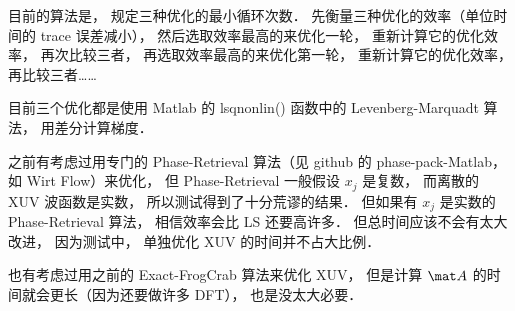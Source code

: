 目前的算法是， 规定三种优化的最小循环次数． 先衡量三种优化的效率（单位时间的 trace 误差减小）， 然后选取效率最高的来优化一轮， 重新计算它的优化效率， 再次比较三者， 再选取效率最高的来优化第一轮， 重新计算它的优化效率， 再比较三者……

目前三个优化都是使用 Matlab 的 lsqnonlin() 函数中的 Levenberg-Marquadt 算法， 用差分计算梯度．

之前有考虑过用专门的 Phase-Retrieval 算法（见 github 的 phase-pack-Matlab， 如 Wirt Flow）来优化， 但 Phase-Retrieval 一般假设 $x_j$ 是复数， 而离散的 XUV 波函数是实数， 所以测试得到了十分荒谬的结果． 但如果有 $x_j$ 是实数的 Phase-Retrieval 算法， 相信效率会比 LS 还要高许多． 但总时间应该不会有太大改进， 因为测试中， 单独优化 XUV 的时间并不占大比例．

也有考虑过用之前的 Exact-FrogCrab 算法来优化 XUV， 但是计算 $\mat A$ 的时间就会更长（因为还要做许多 DFT）， 也是没太大必要．
